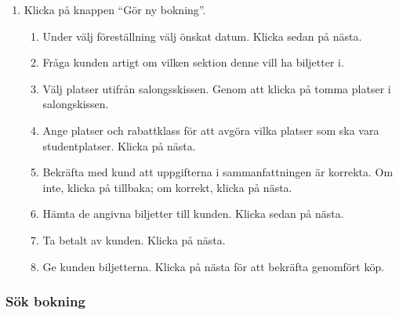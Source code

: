 \documentclass[a4paper, twoside, 11pt, titlepage]{article}
\begin{document}
		\begin{enumerate}
		\item Klicka på knappen ``Gör ny bokning''.

		\begin{enumerate}
		\item Under välj föreställning välj önskat datum. Klicka sedan på nästa.

		\item Fråga kunden artigt om vilken sektion denne vill ha biljetter i.

		\item Välj platser utifrån salongsskissen. Genom att klicka på tomma platser i salongskissen.

		\item Ange platser och rabattklass för att avgöra vilka platser som ska vara studentplatser. Klicka på nästa.

		\item Bekräfta med kund att uppgifterna i sammanfattningen är korrekta. Om inte, klicka på tillbaka; om korrekt, klicka på nästa.

		\item Hämta de angivna biljetter till kunden. Klicka sedan på nästa.

		\item Ta betalt av kunden. Klicka på nästa.

		\item Ge kunden biljetterna. Klicka på nästa för att bekräfta genomfört köp.
		\end{enumerate}
		\end{enumerate}

		\subsubsection{Sök bokning}
\end{document}
